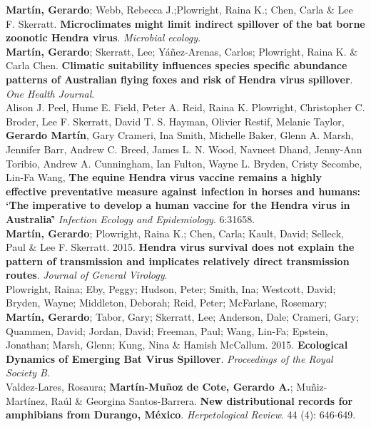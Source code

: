 \documentclass[12pt, a4paper]{article}
\newcommand{\years}[1]{\marginnote{\scriptsize #1}}
\begin{document}
\years{2017} \textbf{Mart\'in, Gerardo}; Webb, Rebecca J.;Plowright, Raina K.; Chen, Carla  \& Lee F. Skerratt. \textbf{Microclimates might limit indirect spillover of the bat borne zoonotic Hendra virus}. \emph{Microbial ecology}.\\

\years{2016} \textbf{Mart\'in, Gerardo}; Skerratt, Lee; Y\'a\~nez-Arenas, Carlos; Plowright, Raina K. \& Carla Chen. \textbf{Climatic suitability influences species specific abundance patterns of Australian flying foxes and risk of Hendra virus spillover}. \emph{One Health Journal}.\\

\years{2016} Alison J. Peel, Hume E. Field, Peter A. Reid, Raina K. Plowright, Christopher C. Broder, Lee F. Skerratt, David T. S. Hayman, Olivier Restif, Melanie Taylor, \textbf{Gerardo Mart\'in}, Gary Crameri, Ina Smith, Michelle Baker, Glenn A. Marsh, Jennifer Barr, Andrew C. Breed, James L. N. Wood, Navneet Dhand, Jenny-Ann Toribio, Andrew A. Cunningham, Ian Fulton, Wayne L. Bryden, Cristy Secombe, Lin-Fa Wang, \textbf{The equine Hendra virus vaccine remains a highly effective preventative measure against infection in horses and humans: \lq The imperative to develop a human vaccine for the Hendra virus in Australia\rq\.} \emph{Infection Ecology and Epidemiology}. {6\bf}:31658.\\

\years{2015} \textbf{Mart\'in, Gerardo}; Plowright, Raina K.; Chen, Carla; Kault, David; Selleck, Paul \& Lee F. Skerratt. 2015. \textbf{Hendra virus survival does not explain the pattern of transmission and implicates relatively direct transmission routes}. \emph{Journal of General Virology}.\\

\years{2015} Plowright, Raina; Eby, Peggy; Hudson, Peter; Smith, Ina; Westcott, David; Bryden, Wayne; Middleton, Deborah; Reid, Peter; McFarlane, Rosemary; \textbf{Mart\'in, Gerardo}; Tabor, Gary; Skerratt, Lee; Anderson, Dale; Crameri, Gary; Quammen, David; Jordan, David; Freeman, Paul; Wang, Lin-Fa; Epstein, Jonathan; Marsh, Glenn; Kung, Nina \& Hamish McCallum. 2015. \textbf{Ecological Dynamics of Emerging Bat Virus Spillover}. \emph{Proceedings of the Royal Society B}.\\

\years{2013} Valdez-Lares, Rosaura; \textbf{Mart\'in-Mu\~noz de Cote, Gerardo A.}; Mu\~niz-Mart\'inez, Ra\'ul \& Georgina Santos-Barrera. \textbf{New distributional records for amphibians from Durango, M\'exico}. \emph{Herpetological Review}. 44 (4): 646-649.\\
\end{document}
